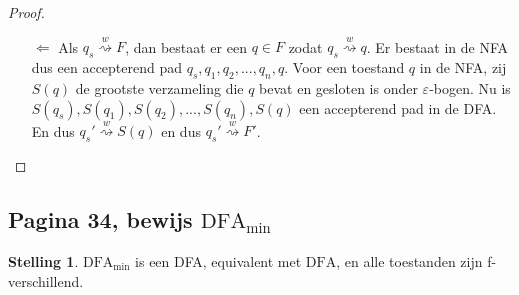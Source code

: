 \documentclass[kulak]{kulakarticle}
\newcommand{\DFA}{\text{DFA}}
\newcommand{\epsilonbogen}{\( \varepsilon \)-bogen}
\newcommand{\pijl}[1]{\overset{#1}{\rightsquigarrow}}
\theoremstyle{definition}
\newtheorem*{stelling}{Stelling}
\begin{document}
\begin{proof}
\begin{enumerate}
\begin{itemize}
				We willen aantonen dat als \(q_{s}' \overset{wa}{\rightsquigarrow} S\), dan geldt \(\forall p \in S: q_s \overset{wa}{\rightsquigarrow} p\). Zij \(S_2\) de toestand in de DFA zodat \(q_{s}' \overset{w}{\rightsquigarrow} S_2\). Wegens de inductiehypothese geldt nu \[ \forall p\in S_2: \quad q_s \overset{w}{\rightsquigarrow} p\]We kunnen in in de DFA in \(S\) geraken door een pijl met label \(a\) te volgen vanuit toestand \(S_2\). Dit betekent precies dat \(S\) de verzameling is van alle toestanden die we in de NFA kunnen bereiken door vanuit een toestand in \(S_2\) een pijl te nemen met een label \(a\) erop, gevolgd door eventueel een aantal \epsilonbogen. En dus geldt voor iedere \(p \in S\) dat \(q_s \pijl{w'} q \), hetgeen we wilden bewijzen.
			\end{itemize}

			Nu volgt de rechterimplicatie \[q_s'\pijl{w}F' \quad \Longrightarrow \quad \exists S \in F': q_s' \pijl{w} S \overset{\text{hierboven}}{\Rightarrow} \forall p \in S: q_s \pijl{w} p \quad \overset{S \in F'}{\Longrightarrow} \quad \exists p \in S : p \in F\] Voor die laatste \(p\) geldt dus ook dat \(q_s \pijl{w} p\) en dus \(q_s \pijl{w} F\)

			\item[\(\Leftarrow\)] Als \(q_s \pijl{w} F\), dan bestaat er een \(q \in F\) zodat \(q_s \pijl{w} q\). Er bestaat in de NFA dus een accepterend pad \(q_s, q_1, q_2, ..., q_n, q\). Voor een toestand \( q \) in de NFA, zij \(S(q)\) de grootste verzameling die \(q\) bevat en gesloten is onder \epsilonbogen. Nu is \(S(q_s), S(q_1), S(q_2), ..., S(q_n), S(q)\) een accepterend pad in de DFA. En dus \(q_{s}' \pijl{w} S(q)\) en dus \(q_{s}' \pijl{w} F'\).
		\end{enumerate}

	\end{proof}

	\subsection*{Pagina 34, bewijs \( \DFA_{\text{min}} \)}

	\begin{stelling}
		\(\DFA_{\text{min}}\) is een DFA, equivalent met \(\DFA\), en alle toestanden zijn f-verschillend.
	\end{stelling}
\end{document}
